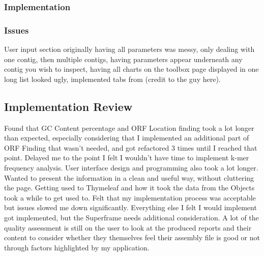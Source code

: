 \subsubsection{Implementation}
\subsubsection{Issues}
User input section originally having all parameters was messy, only dealing with one contig, then multiple contigs, having parameters appear underneath any contig you wish to inspect, having all charts on the toolbox page displayed in one long list looked ugly, implemented tabs from (credit to the guy here).

\subsection{Implementation Review}
Found that GC Content percentage and ORF Location finding took a lot longer than expected, especially considering that I implemented an additional part of ORF Finding that wasn't needed, and got refactored 3 times until I reached that point. Delayed me to the point I felt I wouldn't have time to implement k-mer frequency analysis. 
User interface design and programming also took a lot longer. Wanted to present the information in a clean and useful way, without cluttering the page. Getting used to Thymeleaf and how it took the data from the Objects took a while to get used to. Felt that my implementation process was acceptable but issues slowed me down significantly. Everything else I felt I would implement got implemented, but the Superframe needs additional consideration. A lot of the quality assessment is still on the user to look at the produced reports and their content to consider whether they themselves feel their assembly file is good or not through factors highlighted by my application.




